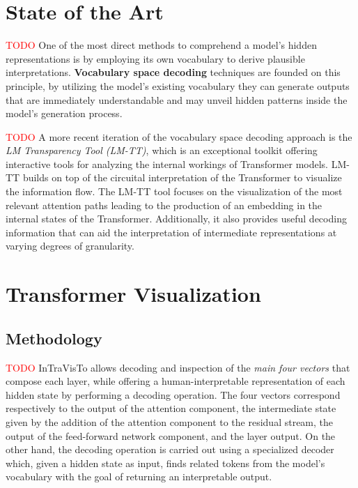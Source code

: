 \documentclass[aspectratio=169, 12pt]{beamer}
\begin{document}
    \section{State of the Art}

    \begin{frame}{}
        \textcolor{red}{TODO}
        One of the most direct methods to comprehend a model's hidden representations is by employing its own vocabulary to derive plausible interpretations.
        \textbf{Vocabulary space decoding} techniques are founded on this principle, by utilizing the model's existing vocabulary they can generate outputs that are immediately understandable and may unveil hidden patterns inside the model's generation process.
    \end{frame}

    \begin{frame}{}
        \textcolor{red}{TODO}
        A more recent iteration of the vocabulary space decoding approach is the \emph{LM Transparency Tool (LM-TT)}, which is an exceptional toolkit offering interactive tools for analyzing the internal workings of Transformer models.
        LM-TT builds on top of the circuital interpretation of the Transformer to visualize the information flow.
        The LM-TT tool focuses on the visualization of the most relevant attention paths leading to the production of an embedding in the internal states of the Transformer.
        Additionally, it also provides useful decoding information that can aid the interpretation of intermediate representations at varying degrees of granularity.
    \end{frame}

    \section{Transformer Visualization}

    \subsection{Methodology}

    \begin{frame}{}
        \textcolor{red}{TODO}
        InTraVisTo allows decoding and inspection of the \emph{main four vectors} that compose each layer, while offering a human-interpretable representation of each hidden state by performing a decoding operation.
        The four vectors correspond respectively to the output of the attention component, the intermediate state given by the addition of the attention component to the residual stream, the output of the feed-forward network component, and the layer output.
        On the other hand, the decoding operation is carried out using a specialized decoder which, given a hidden state as input, finds related tokens from the model's vocabulary with the goal of returning an interpretable output.
    \end{frame}
\end{document}
